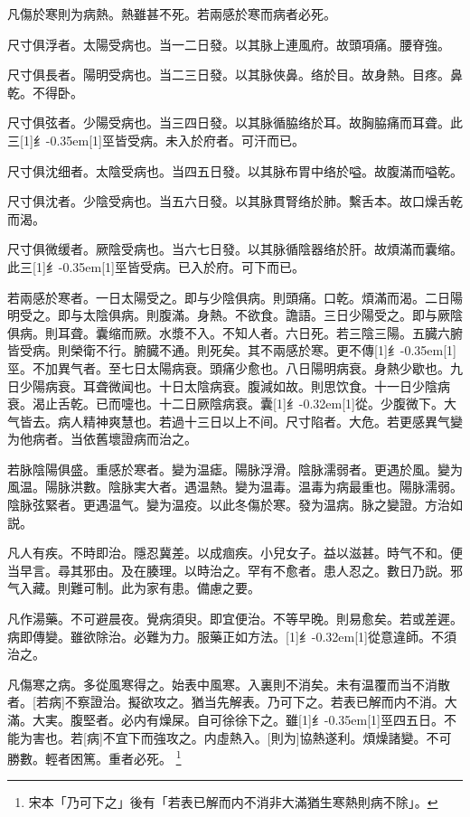\documentclass[11pt,oneside,b5paper]{ctexbook}
\begin{document}
\begin{flushleft}
凡傷於寒則为病熱。熱雖甚不死。若兩感於寒而病者必死。

尺寸俱浮者。太陽受病也。当一二日發。以其脉上連風府。故頭項痛。腰脊強。

尺寸俱長者。陽明受病也。当二三日發。以其脉俠鼻。络於目。故身熱。目疼。鼻乾。不得卧。

尺寸俱弦者。少陽受病也。当三四日發。以其脉循脇络於耳。故胸脇痛而耳聋。此三{\hbox{\scalebox{0.68}[1]{纟}\kern-0.35em\scalebox{0.64}[1]{巠}}}皆受病。未入於府者。可汗而已。

尺寸俱沈细者。太陰受病也。当四五日發。以其脉布胃中络於嗌。故腹滿而嗌乾。

尺寸俱沈者。少陰受病也。当五六日發。以其脉貫腎络於肺。繫舌本。故口燥舌乾而渴。

尺寸俱微缓者。厥陰受病也。当六七日發。以其脉循陰器络於肝。故煩滿而囊缩。此三{\hbox{\scalebox{0.68}[1]{纟}\kern-0.35em\scalebox{0.64}[1]{巠}}}皆受病。已入於府。可下而已。

若兩感於寒者。一日太陽受之。即与少陰俱病。則頭痛。口乾。煩滿而渴。二日陽明受之。即与太陰俱病。則腹滿。身熱。不欲食。譫語。三日少陽受之。即与厥陰俱病。則耳聋。囊缩而厥。水漿不入。不知人者。六日死。若三陰三陽。五臓六腑皆受病。則榮衛不行。腑臓不通。則死矣。其不兩感於寒。更不傳{\hbox{\scalebox{0.68}[1]{纟}\kern-0.35em\scalebox{0.64}[1]{巠}}}。不加異气者。至七日太陽病衰。頭痛少愈也。八日陽明病衰。身熱少歇也。九日少陽病衰。耳聋微闻也。十日太陰病衰。腹減如故。則思饮食。十一日少陰病衰。渴止舌乾。已而嚏也。十二日厥陰病衰。囊{\hbox{\scalebox{0.6}[1]{纟}\kern-0.32em\scalebox{0.7}[1]{從}}}。少腹微下。大气皆去。病人精神爽慧也。若過十三日以上不间。尺寸陷者。大危。若更感異气變为他病者。当依舊壞證病而治之。

若脉陰陽俱盛。重感於寒者。變为温瘧。陽脉浮滑。陰脉濡弱者。更遇於風。變为風温。陽脉洪數。陰脉実大者。遇温熱。變为温毒。温毒为病最重也。陽脉濡弱。陰脉弦緊者。更遇温气。變为温疫。以此冬傷於寒。發为温病。脉之變證。方治如説。

凡人有疾。不時即治。隱忍冀差。以成痼疾。小兒女子。益以滋甚。時气不和。便当早言。尋其邪由。及在腠理。以時治之。罕有不愈者。患人忍之。數日乃説。邪气入藏。則難可制。此为家有患。備慮之要。

凡作湯藥。不可避晨夜。覺病須臾。即宜便治。不等早晚。則易愈矣。若或差遲。病即傳變。雖欲除治。必難为力。服藥正如方法。{\hbox{\scalebox{0.6}[1]{纟}\kern-0.32em\scalebox{0.7}[1]{從}}}意違師。不須治之。

凡傷寒之病。多從風寒得之。始表中風寒。入裏則不消矣。未有温覆而当不消散者。[若病]不察證治。擬欲攻之。猶当先解表。乃可下之。若表已解而内不消。大滿。大実。腹堅者。必内有燥屎。自可徐徐下之。雖{\hbox{\scalebox{0.68}[1]{纟}\kern-0.35em\scalebox{0.64}[1]{巠}}}四五日。不能为害也。若[病]不宜下而強攻之。内虛熱入。[則为]協熱遂利。煩燥諸變。不可勝數。輕者困篤。重者必死。
\footnote{宋本「乃可下之」後有「若表已解而内不消非大滿猶生寒熱則病不除」。}


\end{flushleft}
\end{document}
